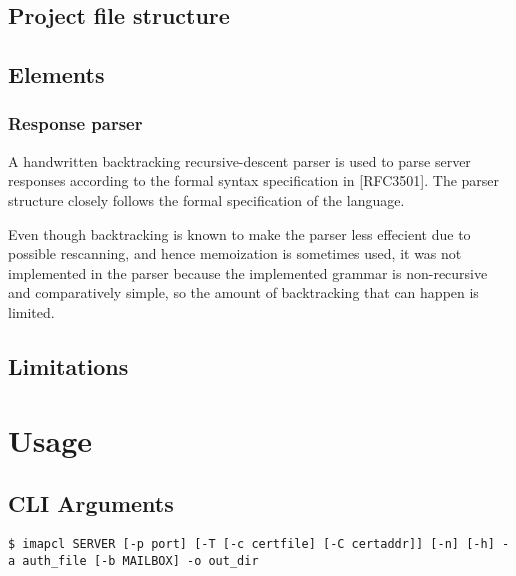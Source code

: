\documentclass[a4]{report}
\begin{document}
\section{Project file structure}

\section{Elements}

\subsection{Response parser}

A handwritten backtracking recursive-descent parser is used to parse server responses according to the formal syntax specification in [RFC3501]. The parser structure closely follows the formal specification of the language.

Even though backtracking is known to make the parser less effecient due to possible rescanning, and hence memoization is sometimes used, it was not implemented in the parser because the implemented grammar is non-recursive and comparatively simple, so the amount of backtracking that can happen is limited.

\section{Limitations}


\chapter{Usage}

\section{CLI Arguments}

\texttt{\$ imapcl SERVER [-p port] [-T [-c certfile] [-C certaddr]] [-n] [-h] -a auth\_file [-b MAILBOX] -o out\_dir}
\end{document}
